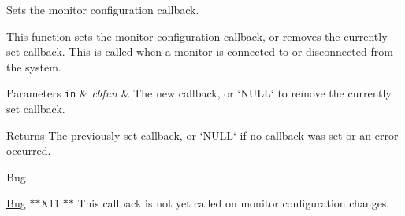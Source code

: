\-Sets the monitor configuration callback. 

\-This function sets the monitor configuration callback, or removes the currently set callback. \-This is called when a monitor is connected to or disconnected from the system.


\begin{DoxyParams}[1]{\-Parameters}
\mbox{\tt in}  & {\em cbfun} & \-The new callback, or `\-N\-U\-L\-L` to remove the currently set callback. \\
\hline
\end{DoxyParams}
\begin{DoxyReturn}{\-Returns}
\-The previously set callback, or `\-N\-U\-L\-L` if no callback was set or an error occurred.
\end{DoxyReturn}
\begin{DoxyRefDesc}{\-Bug}
\item[\hyperlink{bug__bug000001}{\-Bug}]$\ast$$\ast$\-X11\-:$\ast$$\ast$ \-This callback is not yet called on monitor configuration changes.\end{DoxyRefDesc}
